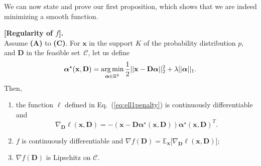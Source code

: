 \documentclass[twoside,11pt]{article}
\def\x{{\mathbf x}}
\def\l{{\ell}}
\def\alphab{{\boldsymbol\alpha}}
\def\D{{\mathbf D}}
\def\E{{\mathbb E}}
\def\C{{\mathcal C}}
\def\Real{{\mathbb R}}
\def\argmin{\operatornamewithlimits{arg\,min}}
\begin{document}
We can now state and prove our first proposition, which shows that we are indeed minimizing a smooth function.
\begin{proposition}{\bf [Regularity of $f$]. \\} \label{prop:regul}
   Assume {\bf (A)} to {\bf (C)}. For $\x$ in the support $K$ of the probability distribution $p$, and $\D$ in the feasible set~$\C$, let us define 
   \begin{equation}
      \alphab^\star(\x,\D)=\argmin_{\alphab \in \Real^k}
      \frac{1}{2}||\x-\D\alphab||_2^2 + \lambda ||\alphab||_1. \label{eq:optim}
   \end{equation}
   Then, 
   \begin{enumerate}
      \item the function $\l$ defined in Eq.~(\ref{eq:ell1penalty}) is
         continuously differentiable and 
         \begin{displaymath}
            \nabla_{\D}\l(\x,\D) = -(\x-\D\alphab^\star(\x,\D))\alphab^{\star}(\x,\D)^T.
      \end{displaymath}
      \item $f$ is continuously differentiable and $\nabla f(\D) =
         \E_\x\big[\nabla_{\D}\l(\x,\D)\big]$;
      \item $\nabla f(\D)$ is Lipschitz on $\C$.
   \end{enumerate}
\end{proposition}
\end{document}
